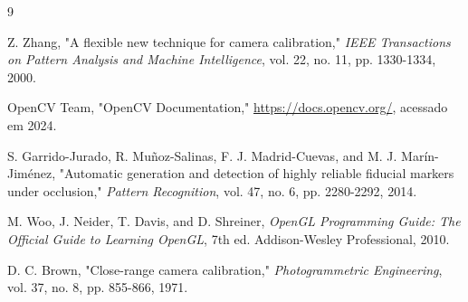 \begin{thebibliography}{9}

Z. Zhang, "A flexible new technique for camera calibration," \textit{IEEE Transactions on Pattern Analysis and Machine Intelligence}, vol. 22, no. 11, pp. 1330-1334, 2000.

OpenCV Team, "OpenCV Documentation," \url{https://docs.opencv.org/}, acessado em 2024.

S. Garrido-Jurado, R. Muñoz-Salinas, F. J. Madrid-Cuevas, and M. J. Marín-Jiménez, "Automatic generation and detection of highly reliable fiducial markers under occlusion," \textit{Pattern Recognition}, vol. 47, no. 6, pp. 2280-2292, 2014.

M. Woo, J. Neider, T. Davis, and D. Shreiner, \textit{OpenGL Programming Guide: The Official Guide to Learning OpenGL}, 7th ed. Addison-Wesley Professional, 2010.

D. C. Brown, "Close-range camera calibration," \textit{Photogrammetric Engineering}, vol. 37, no. 8, pp. 855-866, 1971.

\end{thebibliography}
